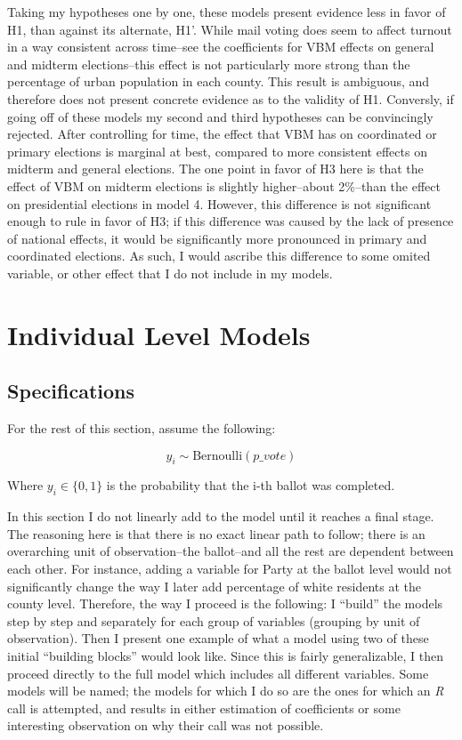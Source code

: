 \documentclass[12pt,twoside]{reedthesis}
\begin{document}
  Taking my hypotheses one by one, these models present evidence less in
  favor of H1, than against its alternate, H1'. While mail voting does
  seem to affect turnout in a way consistent across time--see the
  coefficients for VBM effects on general and midterm elections--this
  effect is not particularly more strong than the percentage of urban
  population in each county. This result is ambiguous, and therefore does
  not present concrete evidence as to the validity of H1. Conversly, if
  going off of these models my second and third hypotheses can be
  convincingly rejected. After controlling for time, the effect that VBM
  has on coordinated or primary elections is marginal at best, compared to
  more consistent effects on midterm and general elections. The one point
  in favor of H3 here is that the effect of VBM on midterm elections is
  slightly higher--about 2\%--than the effect on presidential elections in
  model 4. However, this difference is not significant enough to rule in
  favor of H3; if this difference was caused by the lack of presence of
  national effects, it would be significantly more pronounced in primary
  and coordinated elections. As such, I would ascribe this difference to
  some omited variable, or other effect that I do not include in my
  models.
  
  \section{Individual Level Models}\label{individual-level-models}
  
  \subsection{Specifications}\label{specifications-1}
  
  For the rest of this section, assume the following:
  
  \[y_i \sim \text{Bernoulli}(p\_vote)\]
  
  Where \(y_i \in \{0,1\}\) is the probability that the i-th ballot was
  completed.
  
  In this section I do not linearly add to the model until it reaches a
  final stage. The reasoning here is that there is no exact linear path to
  follow; there is an overarching unit of observation--the ballot--and all
  the rest are dependent between each other. For instance, adding a
  variable for Party at the ballot level would not significantly change
  the way I later add percentage of white residents at the county level.
  Therefore, the way I proceed is the following: I ``build'' the models
  step by step and separately for each group of variables (grouping by
  unit of observation). Then I present one example of what a model using
  two of these initial ``building blocks'' would look like. Since this is
  fairly generalizable, I then proceed directly to the full model which
  includes all different variables. Some models will be named; the models
  for which I do so are the ones for which an \textit{R} call is
  attempted, and results in either estimation of coefficients or some
  interesting observation on why their call was not possible.
  
\end{document}
